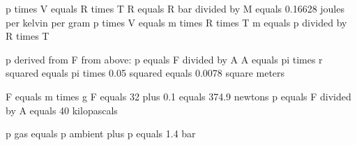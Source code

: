 p times V equals R times T  
R equals R bar divided by M equals 0.16628 joules per kelvin per gram  
p times V equals m times R times T  
m equals p divided by R times T  

p derived from F from above:  
p equals F divided by A  
A equals pi times r squared equals pi times 0.05 squared equals 0.0078 square meters  

F equals m times g  
F equals 32 plus 0.1 equals 374.9 newtons  
p equals F divided by A equals 40 kilopascals  

p gas equals p ambient plus p equals 1.4 bar